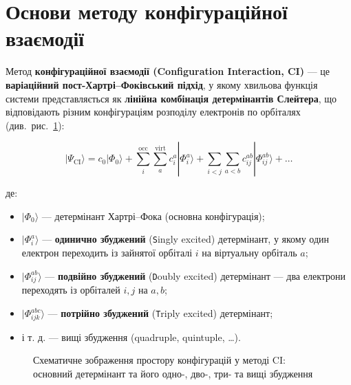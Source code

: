 
\section{Основи методу конфігураційної взаємодії}


Метод \textbf{конфігураційної взаємодії (Configuration Interaction, CI)} --- це \textbf{варіаційний пост-Хартрі–Фоківський підхід}, у якому хвильова функція системи представляється як \textbf{лінійна комбінація детермінантів Слейтера}, що відповідають різним конфігураціям розподілу електронів по орбіталях (див.~рис.~\ref{tikz:CI}):

\begin{equation}
    |\Psi_{\text{CI}}\rangle =
    c_0 |\Phi_0\rangle +
    \sum_i^{\text{occ}} \sum_a^{\text{virt}} c_i^a |\Phi_i^a\rangle +
    \sum_{i<j} \sum_{a<b} c_{ij}^{ab} |\Phi_{ij}^{ab}\rangle + \ldots
\end{equation}

де:
\begin{itemize}
    \item $|\Phi_0\rangle$ --- детермінант Хартрі–Фока (основна конфігурація);
    \item $|\Phi_i^a\rangle$ --- \textbf{одинично збуджений} (\texttt{S}ingly excited) детермінант, у якому один електрон переходить із зайнятої орбіталі $i$ на віртуальну орбіталь $a$;
    \item $|\Phi_{ij}^{ab}\rangle$ --- \textbf{подвійно збуджений} (\texttt{D}oubly excited) детермінант --- два електрони переходять із орбіталей $i,j$ на $a,b$;
    \item $|\Phi_{ijk}^{abc}\rangle$ --- \textbf{потрійно збуджений} (\texttt{T}riply excited) детермінант;
    \item і т. д. --- вищі збудження (quadruple, quintuple, \ldots).
\end{itemize}

\begin{figure}[h!]\centering

\caption{Схематичне зображення простору конфігурацій у методі CI:
основний детермінант та його одно-, дво-, три- та вищі збудження}
\label{tikz:CI}
\end{figure}

